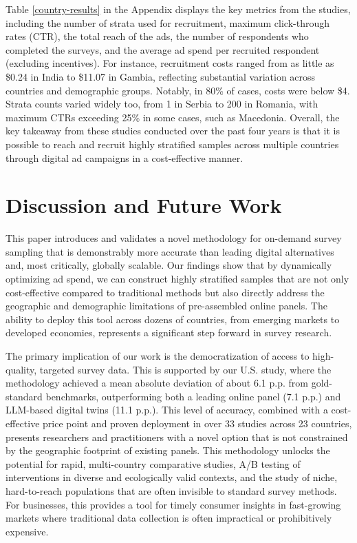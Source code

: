 \documentclass[letterpaper,12pt]{article}
\theoremstyle{proposition}
\begin{document}
Table \ref{country-results} in the Appendix displays the key metrics from the studies, including the number of strata used for recruitment, maximum click-through rates (CTR), the total reach of the ads, the number of respondents who completed the surveys, and the average ad spend per recruited respondent (excluding incentives). For instance, recruitment costs ranged from as little as \$0.24 in India to \$11.07 in Gambia, reflecting substantial variation across countries and demographic groups. Notably, in 80\% of cases, costs were below \$4.
Strata counts varied widely too, from 1 in Serbia to 200 in Romania, with maximum CTRs exceeding 25\% in some cases, such as Macedonia. Overall, the key takeaway from these studies conducted over the past four years is that it is possible to reach and recruit highly stratified samples across multiple countries through digital ad campaigns in a cost-effective manner.


\section*{Discussion and Future Work}

This paper introduces and validates a novel methodology for on-demand survey sampling that is demonstrably more accurate than leading digital alternatives and, most critically, globally scalable. Our findings show that by dynamically optimizing ad spend, we can construct highly stratified samples that are not only cost-effective compared to traditional methods but also directly address the geographic and demographic limitations of pre-assembled online panels. The ability to deploy this tool across dozens of countries, from emerging markets to developed economies, represents a significant step forward in survey research.

The primary implication of our work is the democratization of access to high-quality, targeted survey data. This is supported by our U.S. study, where the methodology achieved a mean absolute deviation of about 6.1 p.p. from gold-standard benchmarks, outperforming both a leading online panel (7.1 p.p.) and LLM-based digital twins (11.1 p.p.). This level of accuracy, combined with a cost-effective price point and proven deployment in over 33 studies across 23 countries, presents researchers and practitioners with a novel option that is not constrained by the geographic footprint of existing panels. This methodology unlocks the potential for rapid, multi-country comparative studies, A/B testing of interventions in diverse and ecologically valid contexts, and the study of niche, hard-to-reach populations that are often invisible to standard survey methods. For businesses, this provides a tool for timely consumer insights in fast-growing markets where traditional data collection is often impractical or prohibitively expensive.
\end{document}
